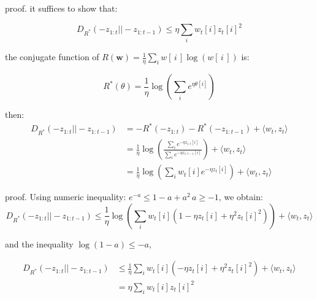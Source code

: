 \documentclass{beamer}
\newcommand{\w}{\mathbf{w}}
\begin{document}
\begin{frame}

\begin{block}{proof.}
it suffices to show that:
\vspace{-0.2cm}

$$D_{R^*}(-z_{1:t}|| -z_{1:t-1}) \leq   \eta    \sum_i w_t[i] z_t[i]^2$$

\vspace{-0.3cm}


\pause

the conjugate function of $R(\w) = \frac{1}{\eta}\sum_{i} w[\,i\,] \log(w[\,i\,])$ is:
\vspace{-0.2cm}


$$R^*(\theta)= \frac{1}{\eta}  \log(\sum_i e^{\eta \theta[i]})$$
\vspace{-0.3cm}

\pause

then:
\begin{align*}
D_{R^*}(-z_{1:t}|| -z_{1:t-1}) & = -R^*(-z_{1:t})- R^*(-z_{1:t-1}) +  \langle w_t, z_t \rangle \\
& = \frac{1}{\eta}  \log(\frac{ \sum_i e^{- \eta z_{1:t}[i]} }{ \sum_i e^{- \eta z_{1:t-1}[i]} })+ \langle w_t, z_t \rangle \\
&=  \frac{1}{\eta}  \log(\sum_i  w_t[i] e^{-\eta z_{t}[i]} )+ \langle w_t, z_t \rangle
\end{align*}

\end{block}

\end{frame}





\begin{frame}

\begin{block}{proof.}
Using numeric inequality: $e^{-a} \leq 1-a+a^2 \,  a\geq -1$, we obtain:
$$D_{R^*}(-z_{1:t}|| -z_{1:t-1}) \leq \frac{1}{\eta}  \log(\sum_i  w_t[i] (1 -\eta z_{t}[i] + \eta^2 z_{t}[i]^2))+ \langle w_t, z_t \rangle$$


\pause

and the inequality $\log(1 - a) \leq  -a$,

\begin{align*}
D_{R^*}(-z_{1:t}|| -z_{1:t-1}) & \leq \frac{1}{\eta}  \sum_i  w_t[i] ( -\eta z_{t}[i] + \eta^2 z_{t}[i]^2)+ \langle w_t, z_t \rangle \\
& =  \eta  \sum_i  w_t[i] z_{t}[i]^2
\end{align*}


\end{block}

\end{frame}
\end{document}
